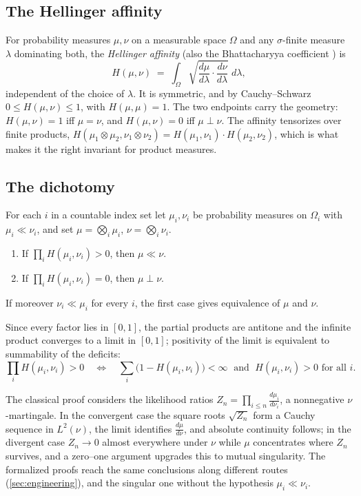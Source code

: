 \documentclass[a4paper,UKenglish,autoref,thm-restate]{lipics-v2021}
\begin{document}
\subsection{The Hellinger affinity}

For probability measures $\mu, \nu$ on a measurable space $\Omega$ and any
$\sigma$-finite measure $\lambda$ dominating both, the \emph{Hellinger
affinity} (also the Bhattacharyya coefficient
\cite{hellinger1909,bhattacharyya1943}) is
\[
  H(\mu, \nu) \;=\; \int_\Omega \sqrt{\frac{d\mu}{d\lambda}\cdot
  \frac{d\nu}{d\lambda}} \; d\lambda ,
\]
independent of the choice of $\lambda$. It is symmetric, and by
Cauchy--Schwarz $0 \le H(\mu,\nu) \le 1$, with $H(\mu,\mu) = 1$. The two
endpoints carry the geometry: $H(\mu,\nu) = 1$ iff $\mu = \nu$, and
$H(\mu,\nu) = 0$ iff $\mu \perp \nu$. The affinity tensorizes over finite
products, $H(\mu_1 \otimes \mu_2, \nu_1 \otimes \nu_2) = H(\mu_1,\nu_1) \cdot
H(\mu_2,\nu_2)$, which is what makes it the right invariant for product
measures.

\subsection{The dichotomy}

\begin{theorem}
\label{thm:kakutani}
For each $i$ in a countable index set let $\mu_i, \nu_i$ be probability
measures on $\Omega_i$ with $\mu_i \ll \nu_i$, and set
$\mu = \bigotimes_i \mu_i$, $\nu = \bigotimes_i \nu_i$.
\begin{enumerate}
\item If $\prod_i H(\mu_i, \nu_i) > 0$, then $\mu \ll \nu$.
\item If $\prod_i H(\mu_i, \nu_i) = 0$, then $\mu \perp \nu$.
\end{enumerate}
If moreover $\nu_i \ll \mu_i$ for every $i$, the first case gives equivalence
of $\mu$ and $\nu$.
\end{theorem}

Since every factor lies in $[0,1]$, the partial products are antitone and the
infinite product converges to a limit in $[0,1]$; positivity of the limit is
equivalent to summability of the deficits:
\[
  \prod_i H(\mu_i,\nu_i) > 0
  \quad\Longleftrightarrow\quad
  \sum_i \bigl(1 - H(\mu_i,\nu_i)\bigr) < \infty
  \;\text{ and }\; H(\mu_i,\nu_i) > 0 \text{ for all } i .
\]

The classical proof \cite{kakutani1948,williams1991} considers the likelihood
ratios $Z_n = \prod_{i \le n} \frac{d\mu_i}{d\nu_i}$, a nonnegative
$\nu$-martingale. In the convergent case the square roots $\sqrt{Z_n}$ form a
Cauchy sequence in $L^2(\nu)$, the limit identifies $\frac{d\mu}{d\nu}$, and
absolute continuity follows; in the divergent case $Z_n \to 0$ almost
everywhere under $\nu$ while $\mu$ concentrates where $Z_n$ survives, and a
zero--one argument upgrades this to mutual singularity. The formalized proofs
reach the same conclusions along different routes (\autoref{sec:engineering}),
and the singular one without the hypothesis $\mu_i \ll \nu_i$.
\end{document}
